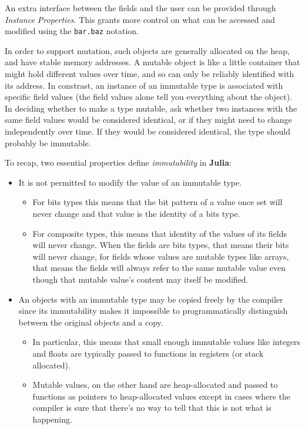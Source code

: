 \documentclass[
]{article}
\providecommand{\tightlist}{%
  \setlength{\itemsep}{0pt}\setlength{\parskip}{0pt}}
\begin{document}
An extra interface between the fields and the user can be provided
through \emph{Instance Properties}. This grants more control on what can
be accessed and modified using the \texttt{bar.baz} notation.

In order to support mutation, such objects are generally allocated on
the heap, and have stable memory addresses. A mutable object is like a
little container that might hold different values over time, and so can
only be reliably identified with its address. In constrast, an instance
of an immutable type is associated with specific field values (the field
values alone tell you everything about the object). In deciding whether
to make a type mutable, ask whether two instances with the same field
values would be considered identical, or if they might need to change
independently over time. If they would be considered identical, the type
should probably be immutable.

To recap, two essential properties define \emph{immutability} in
\textbf{Julia}:

\begin{itemize}
\tightlist
\item
  It is not permitted to modify the value of an immutable type.

  \begin{itemize}
  \tightlist
  \item
    For bits types this means that the bit pattern of a value once set
    will never change and that value is the identity of a bits type.
  \item
    For composite types, this means that identity of the values of its
    fields will never change. When the fields are bits types, that means
    their bits will never change, for fields whose values are mutable
    types like arrays, that means the fields will always refer to the
    same mutable value even though that mutable value's content may
    itself be modified.
  \end{itemize}
\item
  An objects with an immutable type may be copied freely by the compiler
  since its immutability makes it impossible to programmatically
  distinguish between the original objects and a copy.

  \begin{itemize}
  \tightlist
  \item
    In particular, this means that small enough immutable values like
    integers and floats are typically passed to functions in registers
    (or stack allocated).
  \item
    Mutable values, on the other hand are heap-allocated and passed to
    functions as pointers to heap-allocated values except in cases where
    the compiler is sure that there's no way to tell that this is not
    what is happening.
  \end{itemize}
\end{itemize}
\end{document}
